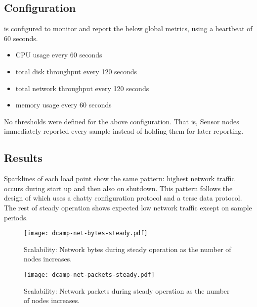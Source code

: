 \subsection{\dcamp Configuration}

\dcamp is configured to monitor and report the below global metrics, using a heartbeat of 60 seconds.

\begin{itemize}
\item CPU usage every 60 seconds
\item total disk throughput every 120 seconds
\item total network throughput every 120 seconds
\item memory usage every 60 seconds
\end{itemize}

No thresholds were defined for the above configuration. That is, Sensor nodes immediately reported every sample instead
of holding them for later reporting.

\subsection{Results}

Sparklines of each load point show the same pattern: highest network traffic occurs during start up and then also on
shutdown. This pattern follows the design of \dcamp which uses a chatty configuration protocol and a terse data
protocol. The rest of steady operation shows expected low network traffic except on sample periods.

\begin{figure}[H]
    \centering
    \vspace{-20pt}
    \texttt{[image: dcamp-net-bytes-steady.pdf]}
    \vspace{-40pt}
    \caption[Scalability: Steady State Network Bytes]
            {Scalability: Network bytes during steady operation as the number of \dcamp nodes increases.}
    \label{fig:net_bytes_steady_graph}
\end{figure}

\begin{figure}[H]
    \centering
    \vspace{-20pt}
    \texttt{[image: dcamp-net-packets-steady.pdf]}
    \vspace{-40pt}
    \caption[Scalability: Steady State Network Packets]
	    {Scalability: Network packets during steady operation as the number of \dcamp nodes increases.}
    \label{fig:net_packets_steady_graph}
\end{figure}

